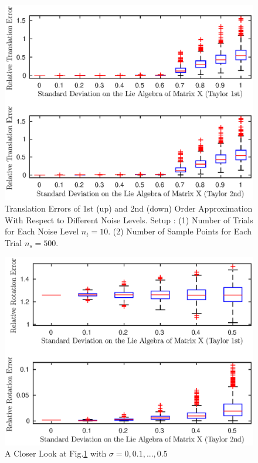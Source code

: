 \documentclass[twocolumn,10pt]{asme2ej}
\begin{document}
\begin{figure}[h]\label{mean_approx_tran}
\includegraphics[scale = 0.60]{Mean_Definition_Figures/mean_trans_rel_10.eps}
\caption{Translation Errors of 1st (up) and 2nd (down) Order Approximation With Respect to Different Noise Levels. Setup : (1) Number of Trials for Each Noise Level $n_t = 10$. (2) Number of Sample Points for Each Trial $n_s = 500$. }
\centering
\end{figure}

\begin{figure}[h]\label{mean_approx_tran_close}
\includegraphics[scale = 0.60]{Mean_Definition_Figures/mean_rot_rel_5.eps}
\caption{A Closer Look at Fig.\ref{mean_approx_tran} with $\sigma = 0, 0.1, ... , 0.5$}
\centering
\end{figure}
\end{document}
